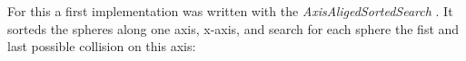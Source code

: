 For this a first implementation was written with the \textit{AxisAligedSortedSearch} \cite{Karras2012}.
It sorteds the spheres along one axis, \eg x-axis, and search for each sphere the fist and last possible collision on this axis:
% 	
